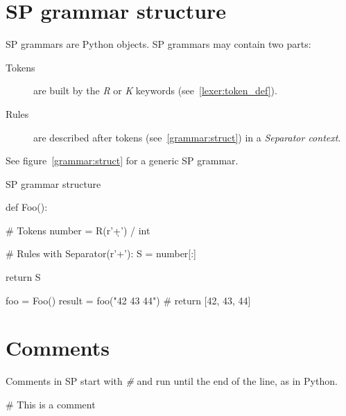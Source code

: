 %
%
%

\section{SP grammar structure}

SP grammars are Python objects.
SP grammars may contain two parts:

\begin{description}
    \item [Tokens]
        are built by the \emph{R} or \emph{K} keywords (see~\ref{lexer:token_def}).
    \item [Rules]
        are described after tokens (see~\ref{grammar:struct}) in a \emph{Separator context}.
\end{description}

See figure~\ref{grammar:struct} for a generic SP grammar.

\begin{code}
\caption{SP grammar structure}                             \label{grammar:struct}
\begin{verbatimtab}[4]
def Foo():

    # Tokens
    number = R(r'\d+') / int

    # Rules
    with Separator(r'\s+'):
        S = number[:]

    return S

foo = Foo()
result = foo("42 43 44") # return [42, 43, 44]
\end{verbatimtab}
\end{code}

\section{Comments}

Comments in SP start with \emph{\#} and run until the end of the line, as in Python.

\begin{verbatimtab}[4]
    # This is a comment
\end{verbatimtab}

